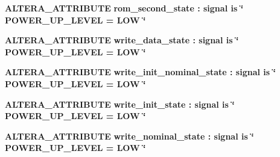 \begin{DoxyCompactItemize}
\item 
{\bf A\+L\+T\+E\+R\+A\+\_\+\+A\+T\+T\+R\+I\+B\+U\+TE} {\bfseries {\bfseries {\bf rom\+\_\+second\+\_\+state}} \textcolor{vhdlchar}{ }\textcolor{vhdlchar}{\+:}\textcolor{vhdlchar}{ }\textcolor{keywordflow}{signal}\textcolor{vhdlchar}{ }\textcolor{keywordflow}{is}\textcolor{vhdlchar}{ }\textcolor{vhdlchar}{ }\textcolor{vhdlchar}{ }\textcolor{vhdlchar}{ }\textcolor{keyword}{\char`\"{} P\+O\+W\+E\+R\+\_\+\+U\+P\+\_\+\+L\+E\+V\+E\+L = L\+O\+W \char`\"{}}\textcolor{vhdlchar}{ }} 
\item 
{\bf A\+L\+T\+E\+R\+A\+\_\+\+A\+T\+T\+R\+I\+B\+U\+TE} {\bfseries {\bfseries {\bf write\+\_\+data\+\_\+state}} \textcolor{vhdlchar}{ }\textcolor{vhdlchar}{\+:}\textcolor{vhdlchar}{ }\textcolor{keywordflow}{signal}\textcolor{vhdlchar}{ }\textcolor{keywordflow}{is}\textcolor{vhdlchar}{ }\textcolor{vhdlchar}{ }\textcolor{vhdlchar}{ }\textcolor{vhdlchar}{ }\textcolor{keyword}{\char`\"{} P\+O\+W\+E\+R\+\_\+\+U\+P\+\_\+\+L\+E\+V\+E\+L = L\+O\+W \char`\"{}}\textcolor{vhdlchar}{ }} 
\item 
{\bf A\+L\+T\+E\+R\+A\+\_\+\+A\+T\+T\+R\+I\+B\+U\+TE} {\bfseries {\bfseries {\bf write\+\_\+init\+\_\+nominal\+\_\+state}} \textcolor{vhdlchar}{ }\textcolor{vhdlchar}{\+:}\textcolor{vhdlchar}{ }\textcolor{keywordflow}{signal}\textcolor{vhdlchar}{ }\textcolor{keywordflow}{is}\textcolor{vhdlchar}{ }\textcolor{vhdlchar}{ }\textcolor{vhdlchar}{ }\textcolor{vhdlchar}{ }\textcolor{keyword}{\char`\"{} P\+O\+W\+E\+R\+\_\+\+U\+P\+\_\+\+L\+E\+V\+E\+L = L\+O\+W \char`\"{}}\textcolor{vhdlchar}{ }} 
\item 
{\bf A\+L\+T\+E\+R\+A\+\_\+\+A\+T\+T\+R\+I\+B\+U\+TE} {\bfseries {\bfseries {\bf write\+\_\+init\+\_\+state}} \textcolor{vhdlchar}{ }\textcolor{vhdlchar}{\+:}\textcolor{vhdlchar}{ }\textcolor{keywordflow}{signal}\textcolor{vhdlchar}{ }\textcolor{keywordflow}{is}\textcolor{vhdlchar}{ }\textcolor{vhdlchar}{ }\textcolor{vhdlchar}{ }\textcolor{vhdlchar}{ }\textcolor{keyword}{\char`\"{} P\+O\+W\+E\+R\+\_\+\+U\+P\+\_\+\+L\+E\+V\+E\+L = L\+O\+W \char`\"{}}\textcolor{vhdlchar}{ }} 
\item 
{\bf A\+L\+T\+E\+R\+A\+\_\+\+A\+T\+T\+R\+I\+B\+U\+TE} {\bfseries {\bfseries {\bf write\+\_\+nominal\+\_\+state}} \textcolor{vhdlchar}{ }\textcolor{vhdlchar}{\+:}\textcolor{vhdlchar}{ }\textcolor{keywordflow}{signal}\textcolor{vhdlchar}{ }\textcolor{keywordflow}{is}\textcolor{vhdlchar}{ }\textcolor{vhdlchar}{ }\textcolor{vhdlchar}{ }\textcolor{vhdlchar}{ }\textcolor{keyword}{\char`\"{} P\+O\+W\+E\+R\+\_\+\+U\+P\+\_\+\+L\+E\+V\+E\+L = L\+O\+W \char`\"{}}\textcolor{vhdlchar}{ }} 
\end{DoxyCompactItemize}

